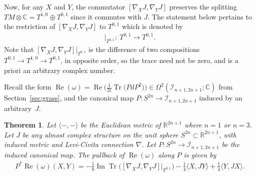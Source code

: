 \documentclass[pdftex]{sigma}
\DeclareMathOperator{\Tr}{Tr}
\newtheorem{thm}{Theorem}[section]
\numberwithin{equation}{section}
\newcommand{\R}{\mathbb{R}}
\newcommand{\CC}{\mathbb{C}}
\newcommand{\cI}{{\mathcal I}}
\begin{document}
 Now, for any $X$ and $Y$, the commutator $[\nabla_X J, \nabla_Y J]$ preserves the splitting $TM \otimes \CC = T^{1,0} \oplus T^{0,1}$ since it commutes with $J$. The statement below pertains to the restriction of $[\nabla_X J, \nabla_Y J]$ to $T^{0,1}$ which is denoted by
 \begin{gather*}
[ \nabla_X J , \nabla_Y J ] \big|_{T^{0,1}} \colon \ T^{0,1} \to T^{0,1}.
 \end{gather*}
 Note that $ [ \nabla_X J , \nabla_Y J ] \big|_{T^{0,1}}$ is the difference of two compositions $T^{0,1} \to T^{1,0} \to T^{0,1}$, in opposite order, so the trace need not be zero, and is a priori an arbitrary complex number.

Recall the form $\operatorname{Re}(\omega) = \operatorname{Re}\big( \frac{1}{ 2i} \Tr\big(PdP^2\big) \big) \in \Omega^2(\cI_{n+1,2n+1};\CC)$ from Section~\ref{sec;grass}, and the cano\-ni\-cal map $P\colon S^{2n} \to \cI_{n+1,2n+1}$ induced by an arbitrary~$J$.

\begin{thm} \label{thm;Pcanon}
Let $\langle -,- \rangle $ be the Euclidean metric of $\R^{2n+1}$ where $n=1$ or $n=3$. Let $J$ be any almost complex structure on the unit sphere $S^{2n} \subset \R^{2n+1}$, with induced metric and Levi-Civita connection $\nabla$. Let $P\colon S^{2n} \to \cI_{n+1,2n+1}$ be the induced canonical map. The pullback of $\operatorname{Re}(\omega)$ along $P$ is given by
\begin{gather*}
 P^* \operatorname{Re} ( \omega) (X,Y) =-\frac{1}{8} \operatorname{Im} \Tr \big([ \nabla_X J , \nabla_Y J ] \big|_{T^{0,1}} \big)
 - \frac 1 4 \langle X,JY \rangle + \frac 1 4 \langle Y,JX \rangle .
\end{gather*}
\end{thm}
\end{document}
